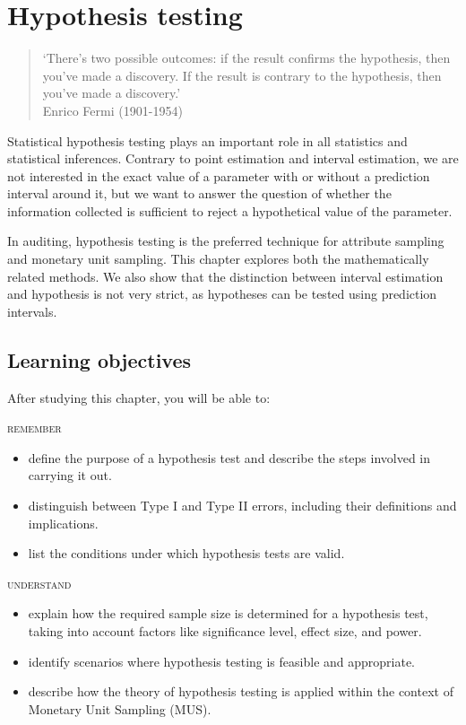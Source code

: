 
\chapter{Hypothesis testing} %
\label{cha:hypothesis_testing}

\begin{quote}
`There's two possible outcomes:  \newline if the result confirms the hypothesis, then you've made a discovery. \newline If the result is contrary to the hypothesis, then you've made a discovery.'\\
Enrico Fermi (1901-1954)
\end{quote}


Statistical hypothesis testing plays an important role in all statistics and statistical inferences. Contrary to point estimation and interval estimation, we are not interested in the exact value of a parameter with or without a prediction interval around it, but we want to answer the question of whether the information collected is sufficient to reject a hypothetical value of the parameter.

In auditing, hypothesis testing is the preferred technique for attribute sampling and monetary unit sampling. This chapter explores both the mathematically related methods. We also show that the distinction between interval estimation and hypothesis is not very strict, as hypotheses can be tested using prediction intervals.

\section*{Learning objectives}
After studying this chapter, you will be able to:

\bigskip
\noindent \textsc{remember}

\begin{itemize}

\item define the purpose of a hypothesis test and describe the steps involved in carrying it out.
\item distinguish between Type I and Type II errors, including their defi\-nitions and implications.
\item list the conditions under which hypothesis tests are valid.
\end{itemize}

\noindent \textsc{understand}
\begin{itemize}

\item explain how the required sample size is determined for a hypothesis test, taking into account factors like significance level, effect size, and power.
\item identify scenarios where hypothesis testing is feasible and appropriate.
\item describe how the theory of hypothesis testing is applied within the context of Monetary Unit Sampling (MUS).
\end{itemize}


